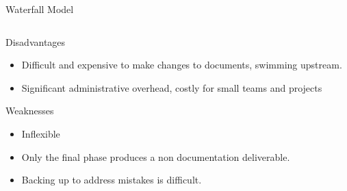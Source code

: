 \documentclass[final,hyperref={pdfpagelabels=false}]{beamer}
\begin{document}
\begin{frame}{ Waterfall Model}
\begin{columns}[t]
\begin{column}{.48\linewidth}
\begin{block}{Disadvantages}
\begin{itemize}
          \item Difficult and expensive to make changes to
                documents, swimming upstream.
          \item Significant administrative overhead, costly for small
                teams and projects
          \end{itemize}
        \end{block}
        \begin{block}{Weaknesses}
          \begin{itemize}
          \item Inflexible
          \item Only the final phase
                produces a non documentation
                deliverable.
          \item Backing up to
                address mistakes is
                difficult.
          \end{itemize}
        \end{block}
      \end{column}
    \end{columns}
  \end{frame}
\end{document}
